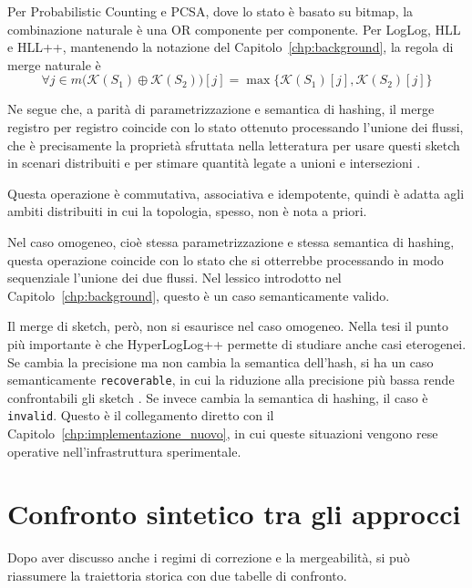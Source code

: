 Per Probabilistic Counting e PCSA, dove lo stato è basato su bitmap, la
combinazione naturale è una OR componente per componente. Per LogLog, HLL e
HLL++, mantenendo la notazione del Capitolo~\ref{chp:background}, la regola di
merge naturale è
\[
\forall j \in m \bigl(\mathcal{K}(S_1)\oplus \mathcal{K}(S_2)\bigr)[j]
=\max\{\mathcal{K}(S_1)[j],\mathcal{K}(S_2)[j]\}
\]

Ne segue che, a parità di parametrizzazione e semantica di hashing, il merge
registro per registro coincide con lo stato ottenuto processando l'unione dei
flussi, che è precisamente la proprietà sfruttata nella letteratura per usare
questi sketch in scenari distribuiti e per stimare quantità legate a unioni e
intersezioni \cite{Ting_2016_UnionsIntersections,Ertl_2017_HLLAlgorithms}.

Questa operazione è commutativa, associativa e idempotente, quindi è adatta agli ambiti distribuiti in cui la topologia, spesso,
non è nota a priori.

Nel caso omogeneo, cioè stessa parametrizzazione e stessa semantica di hashing,
questa operazione coincide con lo stato che si otterrebbe processando in modo
sequenziale l'unione dei due flussi. Nel lessico introdotto nel
Capitolo~\ref{chp:background}, questo è un caso semanticamente valido.

Il merge di sketch, però, non si esaurisce nel caso omogeneo. Nella tesi il
punto più importante è che HyperLogLog++ permette di studiare anche casi
eterogenei. Se cambia la precisione ma non cambia la semantica dell'hash, si
ha un caso semanticamente \texttt{recoverable}, in cui la riduzione alla
precisione più bassa rende confrontabili gli sketch
\cite{Ertl_2017_HLLAlgorithms}. Se invece cambia la
semantica di hashing, il caso è \texttt{invalid}. Questo è il collegamento
diretto con il Capitolo~\ref{chp:implementazione_nuovo}, in cui queste
situazioni vengono rese operative nell'infrastruttura sperimentale.

\section{Confronto sintetico tra gli approcci}
Dopo aver discusso anche i regimi di correzione e la mergeabilità, si può
riassumere la traiettoria storica con due tabelle di confronto.

